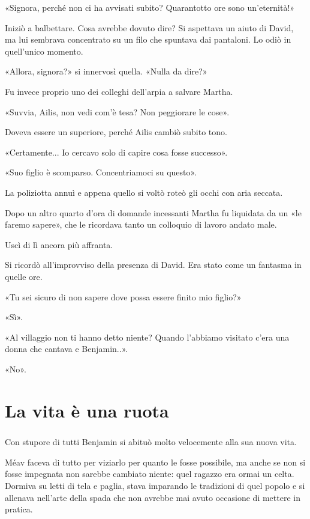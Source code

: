 \documentclass[a4paper,12pt]{book}
\begin{document}
«Signora, perché non ci ha avvisati subito? Quarantotto ore sono
un'eternità!»

Iniziò a balbettare. Cosa avrebbe dovuto dire? Si aspettava un aiuto di David,
ma lui sembrava concentrato su un filo che spuntava dai pantaloni. Lo odiò in
quell'unico momento.

«Allora, signora?» si innervosì quella. «Nulla da dire?»

Fu invece proprio uno dei colleghi dell'arpia a salvare Martha.

«Suvvia, Ailis, non vedi com'è tesa? Non peggiorare le cose».

Doveva essere un superiore, perché Ailis cambiò subito tono.

«Certamente... Io cercavo solo di capire cosa fosse successo».

«Suo figlio è scomparso. Concentriamoci su questo».

La poliziotta annuì e appena quello si voltò roteò gli occhi con aria
seccata.

Dopo un altro quarto d'ora di domande incessanti Martha fu liquidata da un «le
faremo sapere», che le ricordava tanto un colloquio di lavoro andato male.

Uscì di lì ancora più affranta.

Si ricordò all'improvviso della presenza di David. Era stato come un fantasma
in quelle ore.

«Tu sei sicuro di non sapere dove possa essere finito mio figlio?»

«Sì».

«Al villaggio non ti hanno detto niente? Quando l'abbiamo visitato c'era una
donna che cantava e Benjamin..».

«No».

\chapter{La vita è una ruota}

\paragraph{}
Con stupore di tutti Benjamin si abituò molto velocemente alla sua nuova vita.

Méav faceva di tutto per viziarlo per quanto le fosse possibile, ma anche se
non si fosse impegnata non sarebbe cambiato niente: quel ragazzo era ormai un
celta. Dormiva su letti di tela e paglia, stava imparando le tradizioni di quel
popolo e si allenava nell'arte della spada che non avrebbe mai avuto occasione
di mettere in pratica.
\end{document}
